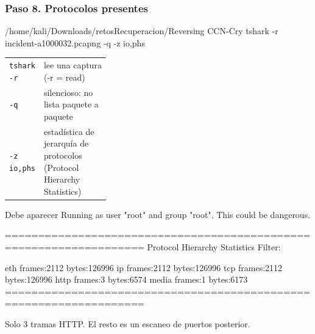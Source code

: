 \documentclass[11pt,a4paper]{article}
\begin{document}
\subsubsection*{Paso 8. Protocolos presentes}
\begin{comando}{/home/kali/Downloads/retosRecuperacion/Reversing CCN-Cry}
tshark -r incident-a1000032.pcapng -q -z io,phs
\end{comando}
\begin{tcolorbox}[enhanced, breakable, colback=gray!3, colframe=gray!35, boxrule=0.3pt, arc=1pt, left=4pt, right=4pt, top=2pt, bottom=2pt, fonttitle=\sffamily\scriptsize\bfseries, coltitle=black!70, colbacktitle=gray!10, title={Qué hace cada parte}, attach title to upper, before skip=2pt, after skip=4pt, fontupper=\small]
\par{\renewcommand{\arraystretch}{1.12}\begin{tabularx}{\linewidth}{@{}>{\raggedright\arraybackslash}p{0.33\linewidth}>{\raggedright\arraybackslash}X@{}}
\texttt{tshark -r} & lee una captura (-r = read) \\
\texttt{-q} & silencioso: no lista paquete a paquete \\
\texttt{-z io,\allowbreak{}phs} & estadística de jerarquía de protocolos (Protocol Hierarchy Statistics) \\
\end{tabularx}}
\end{tcolorbox}
\begin{salida}{Debe aparecer}
Running as user "root" and group "root". This could be dangerous.

===================================================================
Protocol Hierarchy Statistics
Filter: 

eth                                      frames:2112 bytes:126996
  ip                                     frames:2112 bytes:126996
    tcp                                  frames:2112 bytes:126996
      http                               frames:3 bytes:6574
        media                            frames:1 bytes:6173
===================================================================
\end{salida}
\begin{nota}Solo 3 tramas HTTP. El resto es un escaneo de puertos posterior.\end{nota}
\end{document}
